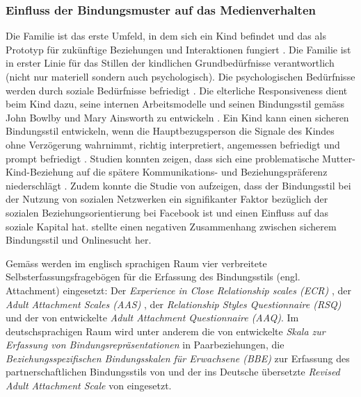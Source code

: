 \subsubsection{Einfluss der Bindungsmuster auf das Medienverhalten} 
Die Familie ist das erste Umfeld, in dem sich ein Kind befindet  und das als Prototyp für zukünftige Beziehungen und Interaktionen fungiert \cite{Floros2013}. Die Familie ist in erster Linie für das Stillen der kindlichen Grundbedürfnisse verantwortlich (nicht nur materiell sondern auch psychologisch). Die psychologischen Bedürfnisse werden durch soziale Bedürfnisse befriedigt \cite{Hazan1994}. Die elterliche Responsiveness dient beim Kind dazu, seine internen Arbeitsmodelle und seinen Bindungsstil gemäss John Bowlby \cite{Bowlby1969} und Mary Ainsworth \cite{Bell1972} zu entwickeln \cite{Bretherton1999}. Ein Kind kann einen sicheren Bindungsstil entwickeln, wenn die Hauptbezugsperson die Signale des Kindes ohne Verzögerung wahrnimmt, richtig interpretiert, angemessen befriedigt und prompt befriedigt \cite{Bell1972}. Studien konnten zeigen, dass sich eine problematische Mutter-Kind-Beziehung auf die spätere Kommunikations- und Beziehungspräferenz niederschlägt \cite{Szwedo2011}. Zudem konnte die Studie von  aufzeigen, dass der Bindungsstil bei der Nutzung von sozialen Netzwerken ein signifikanter Faktor bezüglich der sozialen Beziehungsorientierung bei Facebook ist und einen Einfluss auf das soziale Kapital hat.  stellte einen negativen Zusammenhang zwischen sicherem Bindungsstil und Onlinesucht her.  

Gemäss  werden im englisch sprachigen Raum vier verbreitete Selbsterfassungsfragebögen für die Erfassung des Bindungsstils (engl. Attachment) eingesetzt: Der \textit{
Experience in Close Relationship scales (ECR)} \cite{Brennan1998}, der \textit{Adult Attachment Scales (AAS)} \cite{Collins1990}, der \textit{Relationship Styles Questionnaire (RSQ)} \cite{Griffin1994} und der von  entwickelte \textit{Adult Attachment Questionnaire (AAQ)}. Im deutschsprachigen Raum wird unter anderem die von  entwickelte \textit{Skala zur Erfassung von Bindungsrepräsentationen} in Paarbeziehungen, die \textit{Beziehungsspezifischen Bindungsskalen für Erwachsene (BBE)} zur Erfassung des partnerschaftlichen Bindungsstils von  und der ins Deutsche übersetzte \textit{Revised Adult Attachment Scale} von  eingesetzt. 

